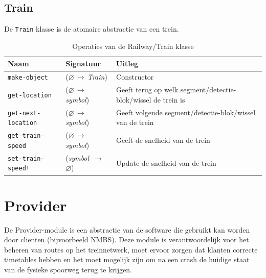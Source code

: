 \documentclass[a4paper, 11pt]{article}
\newcommand{\naar}{\,$\rightarrow$\,}
\renewcommand{\empty}{$\varnothing$}
\newcommand{\<}{\scriptsize\textless\normalsize}
\renewcommand{\>}{\scriptsize\textgreater\normalsize}
\begin{document}
\subsection{Train} %
De \texttt{Train} klasse is de atomaire abstractie van een trein.
\begin{table}[H]
	\begin{center}
		\begin{tabular}{|l l l|}
			\hline
			\textbf{Naam} & \textbf{Signatuur} & \textbf{Uitleg}\\
			\hline
			\texttt{make-object} & (\empty \naar \textit{Train}) & Constructor\\
			\hline
			\texttt{get-location} & (\empty \naar \textit{symbol}) & Geeft terug op welk segment/detectie-blok/wissel de trein is\\
			\texttt{get-next-location} & (\empty \naar \textit{symbol}) & Geeft volgende segment/detectie-blok/wissel van de trein\\
			\texttt{get-train-speed} & (\empty \naar \textit{symbol}) & Geeft de snelheid van de trein\\
			\texttt{set-train-speed!} & (\textit{symbol} \naar \empty) & Update de snelheid van de trein\\
			\hline
		\end{tabular}
		\caption{Operaties van de Railway/Train klasse}
	\end{center}
\end{table}

\newpage

\section{Provider} %
De Provider-module is een abstractie van de software die gebruikt kan worden door clienten (bijvoorbeeld NMBS). Deze module is verantwoordelijk voor het beheren van routes op het treinnetwerk, moet ervoor zorgen dat klanten correcte timetables hebben en het moet mogelijk zijn om na een crash de huidige staat van de fysieke spoorweg terug te krijgen.
\end{document}
